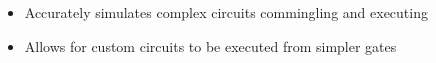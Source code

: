 
\begin{itemize}
\item Accurately simulates complex circuits commingling and executing
\item Allows for custom circuits to be executed from simpler gates
\end{itemize}
